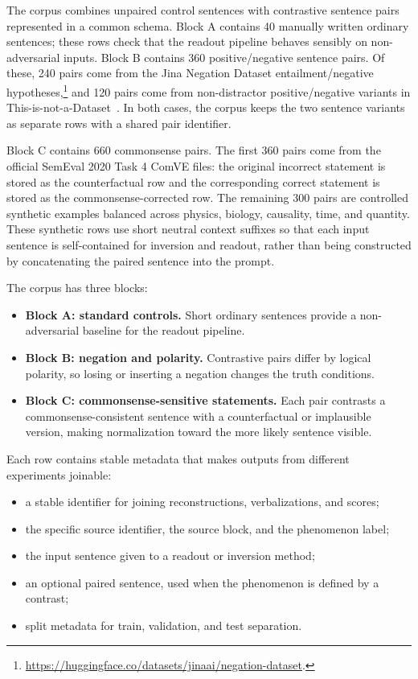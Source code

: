 \documentclass[12pt,a4paper,twoside,openright]{book}
\begin{document}
The corpus combines unpaired control sentences with contrastive sentence pairs
represented in a common schema. Block A contains 40 manually written ordinary
sentences; these rows check that the readout pipeline behaves sensibly on
non-adversarial inputs. Block B contains 360
positive/negative sentence pairs. Of these, 240 pairs come from the Jina
Negation Dataset entailment/negative hypotheses,\footnote{\url{https://huggingface.co/datasets/jinaai/negation-dataset}.}
and 120 pairs come from non-distractor positive/negative variants in
This-is-not-a-Dataset~\cite{DBLP:journals/corr/abs-2310-15941}. In both cases,
the corpus keeps the two sentence variants as separate rows with a shared pair
identifier.

Block C contains 660 commonsense pairs. The first 360 pairs come from the
official SemEval 2020 Task 4 ComVE files: the original incorrect statement is
stored as the counterfactual row and the corresponding correct statement is
stored as the commonsense-corrected row. The remaining 300 pairs are controlled
synthetic examples balanced across physics, biology, causality, time, and
quantity. These synthetic rows use short neutral context suffixes so that each
input sentence is self-contained for inversion and readout, rather than being
constructed by concatenating the paired sentence into the prompt.

The corpus has three blocks:

\begin{itemize}
    \item \textbf{Block A: standard controls.} Short ordinary sentences provide a
    non-adversarial baseline for the readout pipeline.
    \item \textbf{Block B: negation and polarity.} Contrastive pairs differ by
    logical polarity, so losing or inserting a negation changes the truth
    conditions.
    \item \textbf{Block C: commonsense-sensitive statements.} Each pair contrasts
    a commonsense-consistent sentence with a counterfactual or implausible
    version, making normalization toward the more likely sentence visible.
\end{itemize}

Each row contains stable metadata that makes outputs from different experiments
joinable:

\begin{itemize}
    \item a stable identifier for joining reconstructions, verbalizations, and
    scores;
    \item the specific source identifier, the source block, and the phenomenon
    label;
    \item the input sentence given to a readout or inversion method;
    \item an optional paired sentence, used when the phenomenon is defined by a
    contrast;
    \item split metadata for train, validation, and test separation.
\end{itemize}
\end{document}
